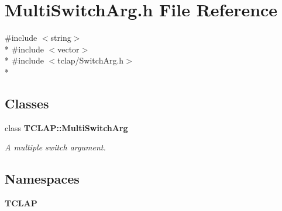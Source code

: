 \section{Multi\+Switch\+Arg.\+h File Reference}
\label{MultiSwitchArg_8h}
{\ttfamily \#include $<$string$>$}\\*
{\ttfamily \#include $<$vector$>$}\\*
{\ttfamily \#include $<$tclap/\+Switch\+Arg.\+h$>$}\\*
\subsection*{Classes}
\begin{DoxyCompactItemize}
\item 
class {\bf T\+C\+L\+A\+P\+::\+Multi\+Switch\+Arg}
\begin{DoxyCompactList}\small\item\em A multiple switch argument. \end{DoxyCompactList}\end{DoxyCompactItemize}
\subsection*{Namespaces}
\begin{DoxyCompactItemize}
\item 
 {\bf T\+C\+L\+A\+P}
\end{DoxyCompactItemize}
